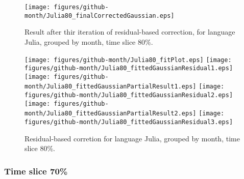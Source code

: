 \begin{figure}[]
\centering
{\texttt{[image: figures/github-month/Julia80\_finalCorrectedGaussian.eps]}}
\caption{Result after thir iteration of residual-based correction, for language Julia, grouped by month, time slice 80\%.}
\end{figure}


\begin{figure}[hb]
\centering
{}
{\texttt{[image: figures/github-month/Julia80\_fitPlot.eps]}}
{\texttt{[image: figures/github-month/Julia80\_fittedGaussianResidual1.eps]}}
{\texttt{[image: figures/github-month/Julia80\_fittedGaussianPartialResult1.eps]}}
{\texttt{[image: figures/github-month/Julia80\_fittedGaussianResidual2.eps]}}
{\texttt{[image: figures/github-month/Julia80\_fittedGaussianPartialResult2.eps]}}
{\texttt{[image: figures/github-month/Julia80\_fittedGaussianResidual3.eps]}}
\caption{Residual-based corretion for language Julia, grouped by month, time slice 80\%.}
\end{figure}


\clearpage 
\newpage 


\FloatBarrier

\subsubsection{Time slice 70\%}

